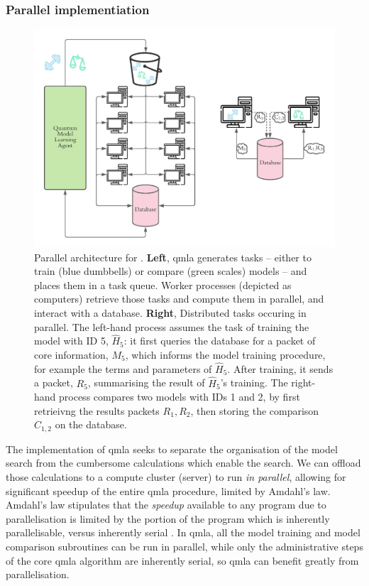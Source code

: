 \subsubsection{Parallel implementiation}\label{sec:parallel}
\begin{figure}
    \includegraphics{algorithms/figures/parallel_architecture.pdf}
    \caption[Parallel architecture for QMLA]{
        Parallel architecture for .
        \textbf{Left}, \gls{qmla} generates tasks 
            -- either to train (blue dumbbells) or compare (green scales) models -- 
            and places them in a task queue. 
        Worker processes (depicted as computers) retrieve those tasks and compute them in parallel, 
            and interact with a database. 
        \textbf{Right}, Distributed tasks occuring in parallel. 
        The left-hand process assumes the task of training the model with ID 5, $\hat{H}_5$:
            it first queries the database for a packet of core information, $M_5$, 
            which informs the model training procedure, for example the terms and parameters 
            of $\hat{H}_5$. 
        After training, it sends a packet, $R_5$, summarising the result of $\hat{H}_5$'s training. 
        The right-hand process compares two models with IDs 1 and 2, by first retrieivng the results packets
            $R_1, R_2$, then storing the comparison $C_{1,2}$ on the database. 
    }
    \label{fig:parallel}
\end{figure}

The implementation of \gls{qmla} seeks to separate the organisation of the  \gls{model search}  from the 
    cumbersome calculations which enable the search. 
We can offload those calculations to a compute cluster (server) to run \emph{in parallel},
    allowing for significant speedup of the entire \gls{qmla} procedure, 
    limited by Amdahl's law. 
Amdahl's law stipulates that the \emph{speedup} available to any program due to parallelisation 
    is limited by the portion of the program which is inherently parallelisable, versus inherently serial \cite{hill2008amdahl}.
In \gls{qmla}, all the model training and model comparison subroutines can be run in parallel, 
    while only the administrative steps of the core \gls{qmla} algorithm are inherently serial, 
    so \gls{qmla} can benefit greatly from parallelisation.
\par

